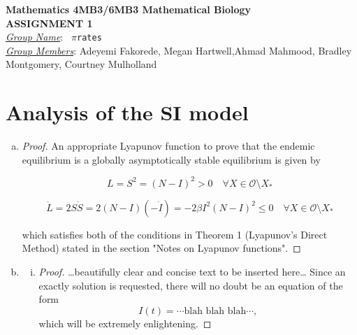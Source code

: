 \documentclass[12pt]{article}
\begin{document}
\begin{center}
{\bfseries Mathematics 4MB3/6MB3 Mathematical Biology\\
 ASSIGNMENT {\color{blue}1}}\\
\medskip
\underline{\emph{Group Name}}: \texttt{{\color{blue} $\pi$rates}}\\
\medskip
\underline{\emph{Group Members}}: {\color{blue}Adeyemi Fakorede, Megan Hartwell,Ahmad Mahmood, Bradley Montgomery, Courtney Mulholland}
\end{center}

\section{Analysis of the SI model}

\SIanalIntro
\begin{enumerate}[(a)]
\item \SIanalQa
  
  {\color{blue}
    \begin{proof}
	      An appropriate Lyapunov function to prove that the endemic equilibrium is a globally asymptotically stable equilibrium is given by 
	      
	      \begin{equation}
	      	L=S^2=(N-I)^2 > 0 \quad \forall X\in\mathcal{O}\setminus{X_*}
	      \end{equation}
	      
	       \begin{equation}
	      	\dot{L}=2S\dot{S}=2(N-I)(-\dot{I})=-2\beta I^2 (N-I)^2 \leq 0 \quad \forall X\in\mathcal{O}\setminus{X_*}
	      \end{equation}
	      
	      which satisfies both of the conditions in Theorem 1 (Lyapunov's Direct Method) stated in the section "Notes on Lyapunov functions".
    \end{proof}
  }
  
\item \SIanalQb
  \begin{enumerate}[(i)]
  \item \SIanalQbi
    
    {\color{blue}
      \begin{proof}
        {\color{magenta}\dots beautifully clear and concise text to be inserted here\dots}
        Since an exactly solution is requested, there will no doubt be an equation of the form
        \begin{equation}
          I(t) = \cdots \text{blah blah blah} \cdots ,
        \end{equation}
        which will be extremely enlightening.
      \end{proof}
    }
    

\end{enumerate}
\end{enumerate}
\end{document}
